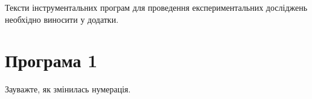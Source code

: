 \label{appendix:A}

Тексти інструментальних програм для проведення експериментальних досліджень необхідно 
виносити у додатки.

\section{Програма 1}

Зауважте, як змінилась нумерація.